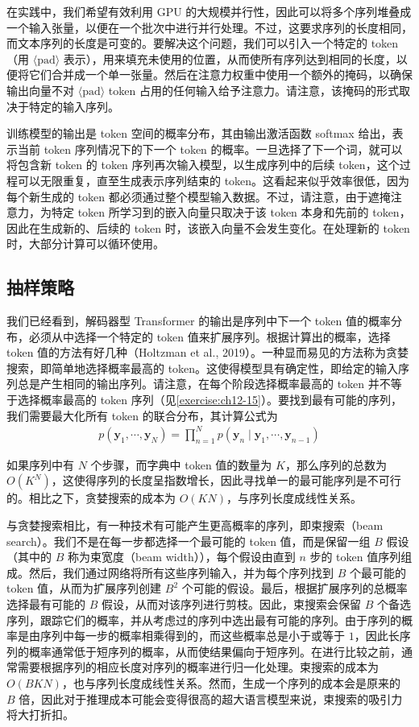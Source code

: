 \documentclass[../../main.tex]{subfiles}
\begin{document}
在实践中，我们希望有效利用 GPU 的大规模并行性，因此可以将多个序列堆叠成一个输入张量，以便在一个批次中进行并行处理。不过，这要求序列的长度相同，而文本序列的长度是可变的。要解决这个问题，我们可以引入一个特定的 token（用 $\langle\mathrm{pad}\rangle$ 表示），用来填充未使用的位置，从而使所有序列达到相同的长度，以便将它们合并成一个单一张量。然后在注意力权重中使用一个额外的掩码，以确保输出向量不对 $\langle\mathrm{pad}\rangle$ token 占用的任何输入给予注意力。请注意，该掩码的形式取决于特定的输入序列。

训练模型的输出是 token 空间的概率分布，其由输出激活函数 softmax 给出，表示当前 token 序列情况下的下一个 token 的概率。一旦选择了下一个词，就可以将包含新 token 的 token 序列再次输入模型，以生成序列中的后续 token，这个过程可以无限重复，直至生成表示序列结束的 token。这看起来似乎效率很低，因为每个新生成的 token 都必须通过整个模型输入数据。不过，请注意，由于遮掩注意力，为特定 token 所学习到的嵌入向量只取决于该 token 本身和先前的 token，因此在生成新的、后续的 token 时，该嵌入向量不会发生变化。在处理新的 token 时，大部分计算可以循环使用。

\subsection{抽样策略}\label{subsection:ch12-抽样策略}

我们已经看到，解码器型 Transformer 的输出是序列中下一个 token 值的概率分布，必须从中选择一个特定的 token 值来扩展序列。根据计算出的概率，选择 token 值的方法有好几种（Holtzman et al., 2019）。一种显而易见的方法称为贪婪搜索，即简单地选择概率最高的 token。这使得模型具有确定性，即给定的输入序列总是产生相同的输出序列。请注意，在每个阶段选择概率最高的 token 并不等于选择概率最高的 token 序列（见\cref{exercise:ch12-15}）。要找到最有可能的序列，我们需要最大化所有 token 的联合分布，其计算公式为
\begin{align}
p(\mathbf{y}_1,\cdots,\mathbf{y}_N)=\prod_{n=1}^{N}p(\mathbf{y}_n\mid\mathbf{y}_1,\cdots,\mathbf{y}_{n-1})
\label{align:ch12-序列联合分布}
\end{align}

如果序列中有 $N$ 个步骤，而字典中 token 值的数量为 $K$，那么序列的总数为 $O(K^{N})$，这使得序列的长度呈指数增长，因此寻找单一的最可能序列是不可行的。相比之下，贪婪搜索的成本为 $O(KN)$，与序列长度成线性关系。

与贪婪搜索相比，有一种技术有可能产生更高概率的序列，即束搜索（beam search）。我们不是在每一步都选择一个最可能的 token 值，而是保留一组 $B$ 假设（其中的 $B$ 称为束宽度（beam width）），每个假设由直到 $n$ 步的 token 值序列组成。然后，我们通过网络将所有这些序列输入，并为每个序列找到 $B$ 个最可能的 token 值，从而为扩展序列创建 $B^{2}$ 个可能的假设。最后，根据扩展序列的总概率选择最有可能的 $B$ 假设，从而对该序列进行剪枝。因此，束搜索会保留 $B$ 个备选序列，跟踪它们的概率，并从考虑过的序列中选出最有可能的序列。由于序列的概率是由序列中每一步的概率相乘得到的，而这些概率总是小于或等于 $1$，因此长序列的概率通常低于短序列的概率，从而使结果偏向于短序列。在进行比较之前，通常需要根据序列的相应长度对序列的概率进行归一化处理。束搜索的成本为 $O(BKN)$，也与序列长度成线性关系。然而，生成一个序列的成本会是原来的 $B$ 倍，因此对于推理成本可能会变得很高的超大语言模型来说，束搜索的吸引力将大打折扣。
\end{document}
